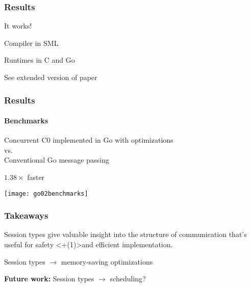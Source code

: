 \documentclass{beamer}
\begin{document}
\begin{frame}
  \frametitle{Results}

  It works!

  \pause\vspace{1em}

  Compiler in SML

  \pause\vspace{1em}

  Runtimes in C and Go

  \pause\vspace{1em}

  \tiny *See extended version of paper

\end{frame}


\begin{frame}
  \frametitle{Results}
  \framesubtitle{Benchmarks}

  \begin{center}
  Concurrent C0 implemented in Go with optimizations \\
  \pause
  vs. \\
  Conventional Go message passing

  \pause\vspace{1em}

    {\huge $1.38\times$ faster}

    \pause\vspace{1em}

    \texttt{[image: go02benchmarks]}
  \end{center}

\end{frame}

\begin{frame}
  \frametitle{Takeaways}

  Session types give valuable insight into the structure of communication that's
  useful for safety \alert<+(1)>{and efficient implementation}.

  \pause \vspace{1em}

  Session types $\rightarrow$ memory-saving optimizations

  \pause \vspace{1em}

  \textbf{Future work:} Session types $\rightarrow$ scheduling?

\end{frame}
\end{document}
